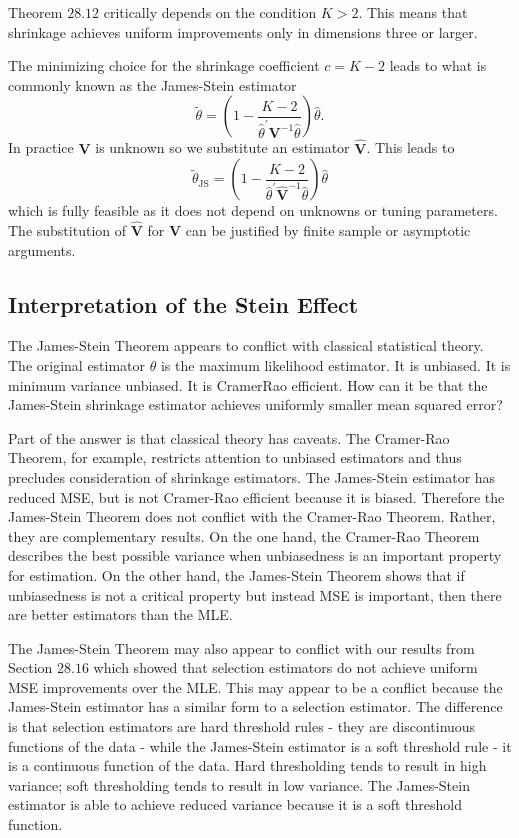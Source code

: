 \documentclass[10pt]{article}
\begin{document}
Theorem $28.12$ critically depends on the condition $K>2$. This means that shrinkage achieves uniform improvements only in dimensions three or larger.

The minimizing choice for the shrinkage coefficient $c=K-2$ leads to what is commonly known as the James-Stein estimator
$$
\widetilde{\theta}=\left(1-\frac{K-2}{\widehat{\theta}^{\prime} \boldsymbol{V}^{-1} \widehat{\theta}}\right) \widehat{\theta} .
$$
In practice $\boldsymbol{V}$ is unknown so we substitute an estimator $\widehat{\boldsymbol{V}}$. This leads to
$$
\widetilde{\theta}_{\mathrm{JS}}=\left(1-\frac{K-2}{\widehat{\theta}^{\prime} \widehat{\boldsymbol{V}}^{-1} \widehat{\theta}}\right) \widehat{\theta}
$$
which is fully feasible as it does not depend on unknowns or tuning parameters. The substitution of $\widehat{\boldsymbol{V}}$ for $\boldsymbol{V}$ can be justified by finite sample or asymptotic arguments.

\subsection{Interpretation of the Stein Effect}
The James-Stein Theorem appears to conflict with classical statistical theory. The original estimator $\widehat{\theta}$ is the maximum likelihood estimator. It is unbiased. It is minimum variance unbiased. It is CramerRao efficient. How can it be that the James-Stein shrinkage estimator achieves uniformly smaller mean squared error?

Part of the answer is that classical theory has caveats. The Cramer-Rao Theorem, for example, restricts attention to unbiased estimators and thus precludes consideration of shrinkage estimators. The James-Stein estimator has reduced MSE, but is not Cramer-Rao efficient because it is biased. Therefore the James-Stein Theorem does not conflict with the Cramer-Rao Theorem. Rather, they are complementary results. On the one hand, the Cramer-Rao Theorem describes the best possible variance when unbiasedness is an important property for estimation. On the other hand, the James-Stein Theorem shows that if unbiasedness is not a critical property but instead MSE is important, then there are better estimators than the MLE.

The James-Stein Theorem may also appear to conflict with our results from Section $28.16$ which showed that selection estimators do not achieve uniform MSE improvements over the MLE. This may appear to be a conflict because the James-Stein estimator has a similar form to a selection estimator. The difference is that selection estimators are hard threshold rules - they are discontinuous functions of the data - while the James-Stein estimator is a soft threshold rule - it is a continuous function of the data. Hard thresholding tends to result in high variance; soft thresholding tends to result in low variance. The James-Stein estimator is able to achieve reduced variance because it is a soft threshold function.
\end{document}
